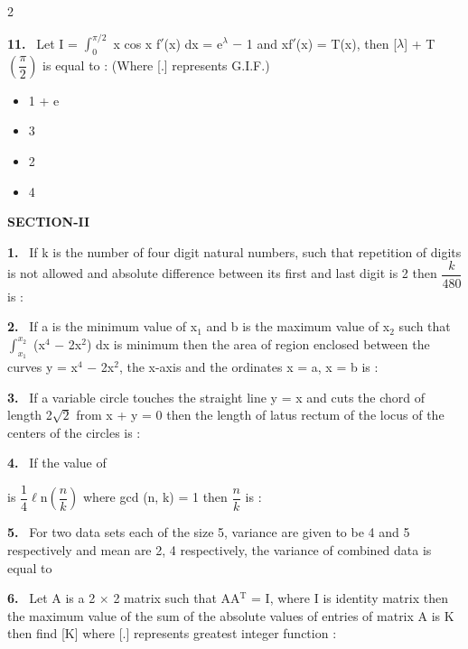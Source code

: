 \documentclass[10pt]{extarticle}
\newcommand{\sect}[1]{\par\smallskip\noindent\textbf{#1}\par}
\newcommand{\qn}[1]{\par\smallskip\noindent\textbf{#1.}~}
\newenvironment{qoptions}{\begin{itemize}[leftmargin=1.8em,itemsep=1pt,topsep=2pt,label={}]}{\end{itemize}}
\newcommand{\opt}[2]{\item[(#1)] #2}
\begin{document}
\begin{multicols}{2}
\qn{11} Let I = $\displaystyle\int_0^{\pi/2}$ x cos x f$'$(x) dx = e$^\lambda$ $-$ 1 and xf$'$(x) = T(x), then [$\lambda$] + T$\left(\dfrac\pi2\right)$ is equal to : (Where [.] represents G.I.F.)
\begin{qoptions}
\opt{A}{1 + e}
\opt{B}{3}
\opt{C}{2}
\opt{D}{4}
\end{qoptions}
\sect{SECTION-II}
\qn{1} If k is the number of four digit natural numbers, such that repetition of digits is not allowed and absolute difference between its first and last digit is 2 then $\dfrac k{480}$ is :
\qn{2} If a is the minimum value of x$_1$ and b is the maximum value of x$_2$ such that $\displaystyle\int_{x_1}^{x_2}$ (x$^4$ $-$ 2x$^2$) dx is minimum then the area of region enclosed between the curves y = x$^4$ $-$ 2x$^2$, the x-axis and the ordinates x = a, x = b is :
\qn{3} If a variable circle touches the straight line y = x and cuts the chord of length 2$\sqrt2$ from x + y = 0 then the length of latus rectum of the locus of the centers of the circles is :
\qn{4} If the value of\par
\noindent{}\par
is $\dfrac14\ell$n$\left(\dfrac nk\right)$ where gcd (n, k) = 1 then $\dfrac nk$ is :
\qn{5} For two data sets each of the size 5, variance are given to be 4 and 5 respectively and mean are 2, 4 respectively, the variance of combined data is equal to
\qn{6} Let A is a 2 $\times$ 2 matrix such that AA$^\mathrm T$ = I, where I is identity matrix then the maximum value of the sum of the absolute values of entries of matrix A is K then find [K] where [.] represents greatest integer function :
\end{multicols}
\end{document}
